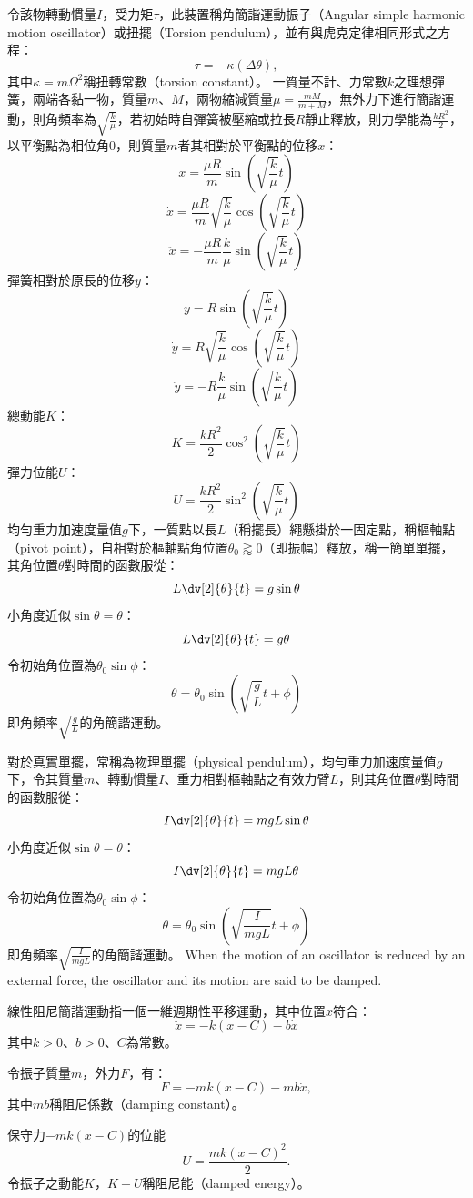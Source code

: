 \documentclass[a4paper,12pt]{article}
\begin{document}
令該物轉動慣量$I$，受力矩$\tau$，此裝置稱角簡諧運動振子（Angular simple harmonic motion oscillator）或扭擺（Torsion pendulum），並有與虎克定律相同形式之方程：
\[\tau=-\kappa(\Delta \theta),\]
其中$\kappa=m\Omega^2$稱扭轉常數（torsion constant）。
一質量不計、力常數$k$之理想彈簧，兩端各黏一物，質量$m$、$M$，兩物縮減質量$\mu=\frac{mM}{m+M}$，無外力下進行簡諧運動，則角頻率為$\sqrt{\frac{k}{\mu}}$，若初始時自彈簧被壓縮或拉長$R$靜止釋放，則力學能為$\frac{kR^2}{2}$，以平衡點為相位角$0$，則質量$m$者其相對於平衡點的位移$x$：
\[x=\frac{\mu R}{m}\sin(\sqrt{\frac{k}{\mu}}t)\]
\[\dot{x}=\frac{\mu R}{m}\sqrt{\frac{k}{\mu}}\cos(\sqrt{\frac{k}{\mu}}t)\]
\[\ddot{x}=-\frac{\mu R}{m}\frac{k}{\mu}\sin(\sqrt{\frac{k}{\mu}}t)\]
彈簧相對於原長的位移$y$：
\[y=R\sin(\sqrt{\frac{k}{\mu}}t)\]
\[\dot{y}=R\sqrt{\frac{k}{\mu}}\cos(\sqrt{\frac{k}{\mu}}t)\]
\[\ddot{y}=-R\frac{k}{\mu}\sin(\sqrt{\frac{k}{\mu}}t)\]
總動能$K$：
\[K=\frac{kR^2}{2}\cos^2(\sqrt{\frac{k}{\mu}}t)\]
彈力位能$U$：
\[U=\frac{kR^2}{2}\sin^2(\sqrt{\frac{k}{\mu}}t)\]
均勻重力加速度量值$g$下，一質點以長$L$（稱擺長）繩懸掛於一固定點，稱樞軸點（pivot point），自相對於樞軸點角位置$\theta_0\gtrapprox 0$（即振幅）釋放，稱一簡單單擺，其角位置$\theta$對時間的函數服從：
\[L\dv[2]{\theta}{t}=g\sin\theta\]
小角度近似$\sin\theta=\theta$：
\[L\dv[2]{\theta}{t}=g\theta\]
令初始角位置為$\theta_0\sin\phi$：
\[\theta=\theta_0\sin(\sqrt{\frac{g}{L}} t+\phi)\]
即角頻率$\sqrt{\frac{g}{L}}$的角簡諧運動。

對於真實單擺，常稱為物理單擺（physical pendulum），均勻重力加速度量值$g$下，令其質量$m$、轉動慣量$I$、重力相對樞軸點之有效力臂$L$，則其角位置$\theta$對時間的函數服從：
\[I\dv[2]{\theta}{t}=mgL\sin\theta\]
小角度近似$\sin\theta=\theta$：
\[I\dv[2]{\theta}{t}=mgL\theta\]
令初始角位置為$\theta_0\sin\phi$：
\[\theta=\theta_0\sin(\sqrt{\frac{I}{mgL}} t+\phi)\]
即角頻率$\sqrt{\frac{I}{mgL}}$的角簡諧運動。
When the motion of an oscillator is reduced by an external force, the oscillator and its motion are said to be damped.

線性阻尼簡諧運動指一個一維週期性平移運動，其中位置$x$符合：
\[\ddot{x}=-k(x-C)-b\dot{x}\]
其中$k>0$、$b>0$、$C$為常數。

令振子質量$m$，外力$F$，有：
\[F=-mk(x-C)-mb\dot{x},\]
其中$mb$稱阻尼係數（damping constant）。

保守力$-mk(x-C)$的位能
\[U=\frac{mk(x-C)^2}{2}.\]
令振子之動能$K$，$K+U$稱阻尼能（damped energy）。
\end{document}
